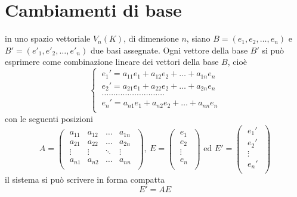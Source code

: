 \newpage
{}

\section{Cambiamenti di base}
in uno spazio vettoriale \(V_n(K)\), di dimensione \(n\), siano \(B = (e_1,e_2, \ldots ,e_n)\) e \(B' = (e'_1,e'_2, \ldots ,e'_n)\) due basi assegnate. Ogni vettore della base \(B'\) si può esprimere come combinazione lineare dei vettori della base \(B\), cioè \[
\begin{cases}
    \ e_1' = a_{11}e_1+ a_{12}e_2+\ldots + a_{1n}e_n \\
    \ e_2' = a_{21}e_1+ a_{22}e_2+\ldots +a_{2n}e_n \\
    \ \ldots \ldots \ldots \ldots \ldots \ldots \ldots \ldots \ldots  \\
    \ e_n'= a_{n 1}e_1+ a_{n 2}e_2 + \ldots + a_{nn}e_n \\
\end{cases}
\]con le seguenti posizioni \[
A = 
\left( \; \begin{matrix}
    a_{11} & a_{12} & \ldots  & a_{1n} \\
    a_{21} & a_{22} & \ldots  & a_{2n} \\
    \vdots & \vdots & \ddots & \vdots \\
    a_{n1} & a_{n 2} & \ldots  & a_{nn} \\
\end{matrix} \; \right), \ E= 
\left( \; \begin{matrix}
    e_1 \\
    e_2 \\
    \vdots \\
    e_n \\
\end{matrix} \; \right) \text{ ed } E'=
\left( \; \begin{matrix}
    e_1' \\
    e_2' \\
    \vdots \\
    e_n' \\
\end{matrix} \; \right)
\] 
il sistema si può scrivere in forma compatta \[
E' = AE
\] 

